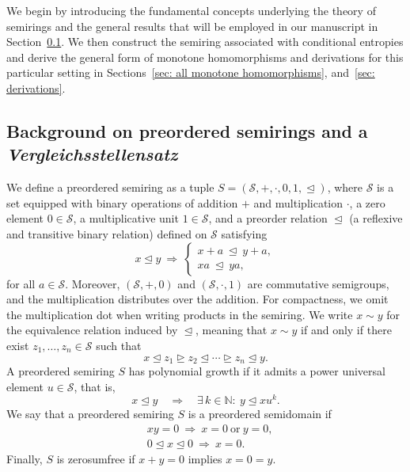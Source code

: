\documentclass[aps,pra,11pt,onecolumn,nofootinbib,tightenlines]{revtex4-2}
\theoremstyle{definition}
\newcommand{\rleq}{\trianglelefteq}
\newcommand{\rgeq}{\trianglerighteq}
\begin{document}
We begin by introducing the fundamental concepts underlying the theory of semirings and the general results that will be employed in our manuscript in Section~\ref{sec: background semiring}. We then construct the semiring associated with conditional entropies and derive the general form of monotone homomorphisms and derivations for this particular setting in Sections~\ref{sec: all monotone homomorphisms}, and~\ref{sec: derivations}.

\subsection{Background on preordered semirings and a \textit{Vergleichsstellensatz}}
\label{sec: background semiring}
We define a preordered semiring as a tuple $S = (\mathcal{S}, +, \cdot, 0, 1, \rleq)$, where $\mathcal{S}$ is a set equipped with binary operations of addition $+$ and multiplication $\cdot$, a zero element $0 \in \mathcal{S}$, a multiplicative unit $1 \in \mathcal{S}$, and a preorder relation $\rleq$  (a reflexive and transitive binary relation) defined on $\mathcal{S}$  satisfying
\begin{equation}
    x \rleq y \ \Rightarrow \ 
\begin{cases}
x + a \ \rleq\ y + a, \\[0.3em]
x a \ \rleq\ y a,
\end{cases}
\end{equation}
for all $a \in \mathcal{S}$.
Moreover, 
$(\mathcal{S}, +, 0)$ and $(\mathcal{S}, \cdot, 1)$ are commutative semigroups, and the multiplication distributes over the addition.
For compactness, we omit the multiplication dot when writing products in the semiring.
We write $x \sim y$ for the equivalence relation induced by $\rleq$, meaning that $x \sim y$ if and only if there exist $z_1, \ldots, z_n \in \mathcal{S}$ such that
\begin{equation}
    x \rleq z_1 \rgeq z_2 \rleq \cdots \rgeq z_n \rleq y.
\end{equation}
A preordered semiring $S$ has polynomial growth if it admits a power universal element $u \in \mathcal{S}$, that is,
\begin{equation}
    x \rleq y \quad \Rightarrow \quad \exists\, k \in \mathbb{N}:\ y \rleq x u^k.
\end{equation}
We say that a preordered semiring $S$ is a preordered semidomain if
\begin{equation}
    \begin{aligned}
&xy = 0 \ \Rightarrow\ x = 0 \ \text{or} \ y = 0, \\
&0 \rleq x \rleq 0 \ \Rightarrow\ x = 0.
\end{aligned}
\end{equation}
Finally, $S$ is zerosumfree if $x + y = 0$ implies $x = 0 = y$.
\end{document}
